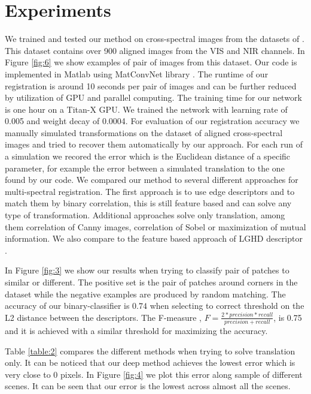 \documentclass[10pt,twocolumn,letterpaper]{article}
\begin{document}
\section{Experiments} \label{sec:experimetns}

We trained and tested our method on cross-spectral images from the datasets of \cite{multiSpectralSIFT}. This dataset contains over 900 aligned images from the VIS and NIR channels. In Figure \ref{fig:6} we show examples of pair of images from this dataset. Our code is implemented in Matlab using MatConvNet library \cite{Vedaldi15}. The runtime of our registration is around 10 seconds per pair of images and can be further reduced by utilization of GPU and parallel computing. The training time for our network is one hour on a Titan-X GPU. We trained the network with learning rate of 0.005 and weight decay of 0.0004. For evaluation of our registration accuracy we manually simulated transformations on the dataset of aligned cross-spectral images and tried to recover them automatically by our approach. For each run of a simulation we recored the error which is the Euclidean distance of a specific parameter, for example the error between a simulated translation to the one found by our code. We compared our method to several different approaches for multi-spectral registration. The first approach is to use edge descriptors and to match them by binary correlation, this is still feature based and can solve any type of transformation. Additional approaches solve only translation, among them correlation of Canny \cite{Canny} images, correlation of Sobel \cite{sobel} or maximization of mutual information. We also compare to the feature based approach of LGHD descriptor \cite{lghd2015}.

In Figure \ref{fig:3} we show our results when trying to classify pair of patches to similar or different. The positive set is the pair of patches around corners in the dataset while the negative examples are produced by random matching. The accuracy of our binary-classifier is $0.74$ when selecting to correct threshold on the L2 distance between the descriptors. The F-measure \cite{powers2011evaluation}, $F = \frac{2*precision*recall}{precision+recall}$, is 0.75 and it is achieved with a similar threshold for maximizing the accuracy.

Table \ref{table:2} compares the different methods when trying to solve translation only. It can be noticed that our deep method achieves the lowest error which is very close to 0 pixels. In Figure \ref{fig:4} we plot this error along sample of different scenes. It can be seen that our error is the lowest across almost all the scenes.
\end{document}
